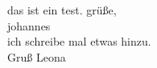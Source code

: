 \documentclass{article}
\begin{document}
das ist ein test. gr\"u{\ss}e,\\

johannes\\

ich schreibe mal etwas hinzu.\\

Gruß Leona
\end{document}

